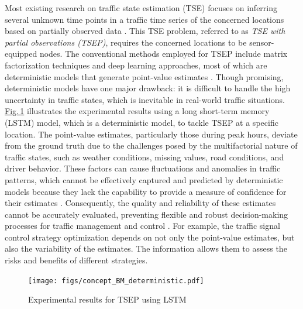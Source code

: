 \documentclass[a4paper,fleqn,12pt]{cas-sc}
\begin{document}
Most existing research on traffic state estimation (TSE) focuses on inferring several unknown time points in a traffic time series of the concerned locations based on partially observed data \citep{Qu2009PPCABasedMD}. This TSE problem, referred to as \textit{TSE with partial observations (TSEP)}, requires the concerned locations to be sensor-equipped nodes. The conventional methods employed for TSEP include matrix factorization techniques and deep learning approaches, most of which are deterministic models that generate point-value estimates \citep{qiu2019nei,chen2021low,wang2023low}. Though promising, deterministic models have one major drawback: it is difficult to handle the high uncertainty in traffic states, which is inevitable in real-world traffic situations. \hyperref[fig:concept_BM_deterministic]{Fig.\,\ref{fig:concept_BM_deterministic}} illustrates the experimental results using a long short-term memory (LSTM) model, which is a deterministic model, to tackle TSEP at a specific location. The point-value estimates, particularly those during peak hours, deviate from the ground truth due to the challenges posed by the multifactorial nature of traffic states, such as weather conditions, missing values, road conditions, and driver behavior. These factors can cause fluctuations and anomalies in traffic patterns, which cannot be effectively captured and predicted by deterministic models because they lack the capability to provide a measure of confidence for their estimates \citep{zhou2020variational}. Consequently, the quality and reliability of these estimates cannot be accurately evaluated, preventing flexible and robust decision-making processes for traffic management and control \citep{jin2022variational}. For example, the traffic signal control strategy optimization depends on not only the point-value estimates, but also the variability of the estimates. The information allows them to assess the risks and benefits of different strategies.

\begin{figure}[pos=htbp,width=8.5cm,align=\centering]
  \centering 
  \texttt{[image: figs/concept\_BM\_deterministic.pdf]}
  \caption{Experimental results for TSEP using LSTM}\label{fig:concept_BM_deterministic}
\end{figure}
\end{document}
